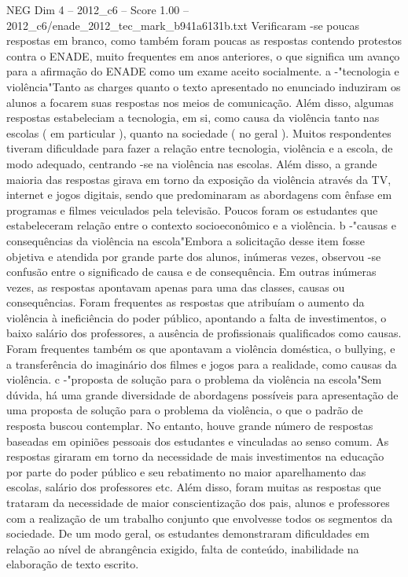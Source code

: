 \begin{textsample}{NEG Dim 4 – 2012\_c6 – Score 1.00 – 2012\_c6/enade\_2012\_tec\_mark\_b941a6131b.txt}
Verificaram -se poucas respostas em branco, como também foram poucas as respostas contendo protestos contra o ENADE, muito frequentes em anos anteriores, o que significa um avanço para a afirmação do ENADE como um exame aceito socialmente. a -"tecnologia e violência"Tanto as charges quanto o texto apresentado no enunciado induziram os alunos a focarem suas respostas nos meios de comunicação.
Além disso, algumas respostas estabeleciam a tecnologia, em si, como causa da violência tanto nas escolas ( em particular ), quanto na sociedade ( no geral ).
Muitos respondentes tiveram dificuldade para fazer a relação entre tecnologia, violência e a escola, de modo adequado, centrando -se na violência nas escolas.
Além disso, a grande maioria das respostas girava em torno da exposição da violência através da TV, internet e jogos digitais, sendo que predominaram as abordagens com ênfase em programas e filmes veiculados pela televisão.
Poucos foram os estudantes que estabeleceram relação entre o contexto socioeconômico e a violência. b -"causas e consequências da violência na escola"Embora a solicitação desse item fosse objetiva e atendida por grande parte dos alunos, inúmeras vezes, observou -se confusão entre o significado de causa e de consequência.
Em outras inúmeras vezes, as respostas apontavam apenas para uma das classes, causas ou consequências.
Foram frequentes as respostas que atribuíam o aumento da violência à ineficiência do poder público, apontando a falta de investimentos, o baixo salário dos professores, a ausência de profissionais qualificados como causas.
Foram frequentes também os que apontavam a violência doméstica, o bullying, e a transferência do imaginário dos filmes e jogos para a realidade, como causas da violência. c -"proposta de solução para o problema da violência na escola"Sem dúvida, há uma grande diversidade de abordagens possíveis para apresentação de uma proposta de solução para o problema da violência, o que o padrão de resposta buscou contemplar.
No entanto, houve grande número de respostas baseadas em opiniões pessoais dos estudantes e vinculadas ao senso comum.
As respostas giraram em torno da necessidade de mais investimentos na educação por parte do poder público e seu rebatimento no maior aparelhamento das escolas, salário dos professores etc.
Além disso, foram muitas as respostas que trataram da necessidade de maior conscientização dos pais, alunos e professores com a realização de um trabalho conjunto que envolvesse todos os segmentos da sociedade.
De um modo geral, os estudantes demonstraram dificuldades em relação ao nível de abrangência exigido, falta de conteúdo, inabilidade na elaboração de texto escrito.

\end{textsample}
